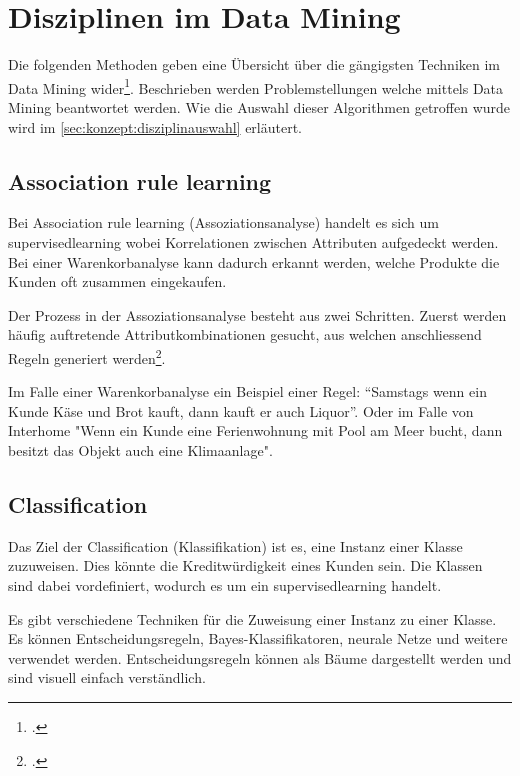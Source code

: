 \section{Disziplinen im Data Mining}
\label{sec:recherche:dataminingtechniken:disziplinen}
Die folgenden Methoden geben eine Übersicht über die gängigsten Techniken im Data Mining wider\footcite{top_10_algorithms}. Beschrieben werden Problemstellungen welche mittels Data Mining beantwortet werden. Wie die Auswahl dieser Algorithmen getroffen wurde wird im \cref{sec:konzept:disziplinauswahl}  erläutert.

\subsection{Association rule learning}
\label{sec:recherche:dataminingtechniken:disziplinen:association}
Bei Association rule learning (Assoziationsanalyse) handelt es sich um \gls{supervisedlearning} wobei Korrelationen zwischen Attributen aufgedeckt werden. Bei einer Warenkorbanalyse kann dadurch erkannt werden, welche Produkte die Kunden oft zusammen eingekaufen.

Der Prozess in der Assoziationsanalyse besteht aus zwei Schritten. Zuerst werden häufig auftretende Attributkombinationen gesucht, aus welchen anschliessend Regeln generiert werden\footcite{association_rule_learning_2017-01-05}.

Im Falle einer Warenkorbanalyse ein Beispiel einer Regel: "`Samstags wenn ein Kunde Käse und Brot kauft, dann kauft er auch Liquor"'. Oder im Falle von Interhome "Wenn ein Kunde eine Ferienwohnung mit Pool am Meer bucht, dann besitzt das Objekt auch eine Klimaanlage".

\subsection{Classification}
\label{sec:recherche:dataminingtechniken:disziplinen:classification}
Das Ziel der Classification (Klassifikation) ist es, eine Instanz einer Klasse zuzuweisen. Dies könnte die Kreditwürdigkeit eines Kunden sein. Die Klassen sind dabei vordefiniert, wodurch es um ein \gls{supervisedlearning} handelt.

Es gibt verschiedene Techniken für die Zuweisung einer Instanz zu einer Klasse. Es können Entscheidungsregeln, Bayes-Klassifikatoren, neurale Netze und weitere verwendet werden. Entscheidungsregeln können als Bäume dargestellt werden und sind visuell einfach verständlich.

